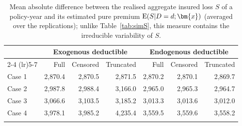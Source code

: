 \begin{table}[!ht]
\footnotesize
\centering
{\color{blue}
\begin{tabular}{lrrrrrr}
\toprule
 & \multicolumn{3}{c}{Exogenous deductible} & \multicolumn{3}{c}{Endogenous deductible} \\
\cmidrule(lr){2-4} \cmidrule(lr){5-7}
 & Full & Censored & Truncated & Full & Censored & Truncated \\
\midrule
Case 1 & 2,870.4 & 2,870.5 & 2,871.5 & 2,870.2 & 2,870.1 & 2,869.7 \\
Case 2 & 2,987.8 & 2,988.4 & 3,166.0 & 2,965.0 & 2,965.3 & 2,964.7 \\
Case 3 & 3,066.6 & 3,103.5 & 3,185.2 & 3,013.3 & 3,013.6 & 3,012.0 \\
Case 4 & 3,978.1 & 3,985.2 & 4,235.4 & 3,559.5 & 3,559.6 & 3,558.2 \\
\hhline{=======}
\end{tabular}
}
\caption{Mean absolute difference between the realised aggregate insured loss $S$ of a policy-year and its estimated pure premium ${\rm E}(S|D=d;\bm{x})$ (averaged over the replications); unlike Table~\ref{tab:simS}, this measure contains the irreducible variability of $S$.}\label{tab:AppSimSobs}
\end{table}
